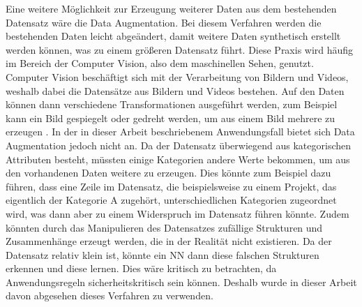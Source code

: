 Eine weitere Möglichkeit zur Erzeugung weiterer Daten aus dem bestehenden Datensatz wäre die Data Augmentation. Bei diesem Verfahren werden die bestehenden Daten 
leicht abgeändert, damit weitere Daten synthetisch erstellt werden können, was zu einem größeren Datensatz führt. Diese Praxis wird häufig im Bereich der Computer Vision,
also dem \glqq maschinellen Sehen\grqq{}, genutzt. Computer Vision beschäftigt sich mit der Verarbeitung von Bildern und Videos, weshalb dabei die Datensätze 
aus Bildern und Videos bestehen. Auf den Daten können dann verschiedene Transformationen ausgeführt werden, zum Beispiel kann ein Bild gespiegelt oder gedreht werden, um aus 
einem Bild mehrere zu erzeugen \cite[vgl. S.184f.]{DL_PY}. In der in dieser Arbeit beschriebenem Anwendungsfall bietet sich Data Augmentation jedoch nicht an. Da der Datensatz überwiegend
aus kategorischen Attributen besteht, müssten einige Kategorien andere Werte bekommen, um aus den vorhandenen Daten weitere zu erzeugen. Dies könnte zum Beispiel dazu führen,
dass eine Zeile im Datensatz, die beispielsweise zu einem Projekt, das eigentlich der Kategorie \glqq A\grqq{} zugehört, unterschiedlichen Kategorien zugeordnet wird, 
was dann aber zu einem Widerspruch im Datensatz führen könnte. Zudem könnten durch das Manipulieren des Datensatzes zufällige Strukturen und Zusammenhänge erzeugt werden,
die in der Realität nicht existieren. Da der Datensatz relativ klein ist, könnte ein \ac{NN} dann diese falschen Strukturen erkennen und diese lernen. Dies wäre kritisch zu betrachten,
da Anwendungsregeln sicherheitskritisch sein können. Deshalb wurde in dieser Arbeit davon abgesehen dieses Verfahren zu verwenden.

